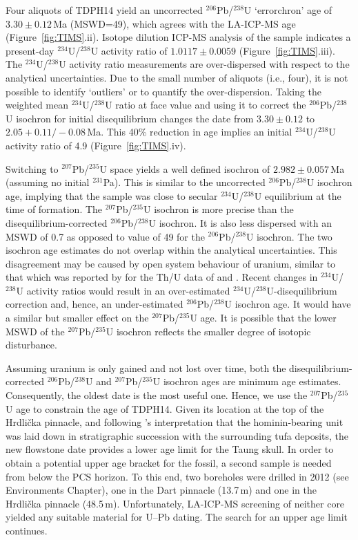 \documentclass[11pt]{article}
\begin{document}
Four aliquots of TDPH14 yield an uncorrected ${}^{206}$Pb/${}^{238}$U
`errorchron' age of $3.30\pm{0.12}$\,Ma (MSWD=49), which agrees with
the LA-ICP-MS age (Figure~\ref{fig:TIMS}.ii). Isotope dilution ICP-MS
analysis of the sample indicates a present-day ${}^{234}$U/${}^{238}$U
activity ratio of $1.0117\pm{0.0059}$ (Figure~\ref{fig:TIMS}.iii). The
${}^{234}$U/${}^{238}$U activity ratio measurements are over-dispersed
with respect to the analytical uncertainties. Due to the small number
of aliquots (i.e., four), it is not possible to identify `outliers' or
to quantify the over-dispersion. Taking the weighted mean
${}^{234}$U/${}^{238}$U ratio at face value and using it to correct
the ${}^{206}$Pb/${}^{238}$U isochron for initial disequilibrium
changes the date from $3.30\pm{0.12}$ to $2.05+0.11/-0.08$\,Ma.  This
40\% reduction in age implies an initial ${}^{234}$U/${}^{238}$U
activity ratio of 4.9 (Figure~\ref{fig:TIMS}.iv).

Switching to ${}^{207}$Pb/${}^{235}$U space yields a well defined
isochron of $2.982\pm{0.057}$\,Ma (assuming no initial
${}^{231}$Pa). This is similar to the uncorrected
${}^{206}$Pb/${}^{238}$U isochron age, implying that the sample was
close to secular ${}^{234}$U/${}^{238}$U equilibrium at the time of
formation. The ${}^{207}$Pb/${}^{235}$U isochron is more precise than
the disequilibrium-corrected ${}^{206}$Pb/${}^{238}$U isochron. It is
also less dispersed with an MSWD of 0.7 as opposed to value of 49 for
the ${}^{206}$Pb/${}^{238}$U isochron. The two isochron age estimates
do not overlap within the analytical uncertainties. This disagreement
may be caused by open system behaviour of uranium, similar to that
which was reported by \citet{tobias1993} for the Th/U data of
\citet{vogel1984} and \citet{tobias1993}. Recent changes in
${}^{234}$U/${}^{238}$U activity ratios would result in an
over-estimated ${}^{234}$U/${}^{238}$U-disequilibrium correction and,
hence, an under-estimated ${}^{206}$Pb/${}^{238}$U isochron age. It
would have a similar but smaller effect on the
${}^{207}$Pb/${}^{235}$U age. It is possible that the lower MSWD of
the ${}^{207}$Pb/${}^{235}$U isochron reflects the smaller degree of
isotopic disturbance.

Assuming uranium is only gained and not lost over time, both the
disequilibrium-corrected ${}^{206}$Pb/${}^{238}$U and
${}^{207}$Pb/${}^{235}$U isochron ages are minimum age
estimates. Consequently, the oldest date is the most useful one.
Hence, we use the ${}^{207}$Pb/${}^{235}$U age to constrain the age of
TDPH14.  Given its location at the top of the Hrdli\v{c}ka pinnacle,
and following \citet{hopley2013}'s interpretation that the
hominin-bearing unit was laid down in stratigraphic succession with
the surrounding tufa deposits, the new flowstone date provides a lower
age limit for the Taung skull. In order to obtain a potential upper
age bracket for the fossil, a second sample is needed from below the
PCS horizon. To this end, two boreholes were drilled in 2012 (see
Environments Chapter), one in the Dart pinnacle (13.7\,m) and one in
the Hrdli\v{c}ka pinnacle (48.5\,m). Unfortunately, LA-ICP-MS
screening of neither core yielded any suitable material for U--Pb
dating. The search for an upper age limit continues.\medskip
\end{document}
